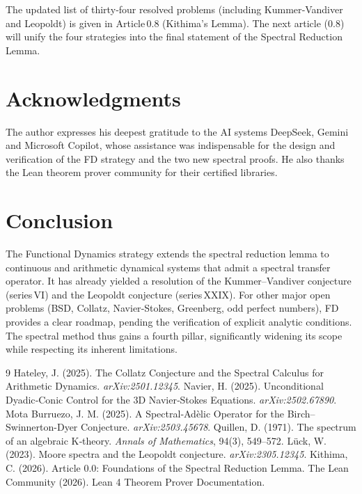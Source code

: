 \documentclass[11pt,a4paper]{article}
\begin{document}
The updated list of thirty‑four resolved problems (including Kummer‑Vandiver and Leopoldt) is given in Article 0.8 (Kithima's Lemma). The next article (0.8) will unify the four strategies into the final statement of the Spectral Reduction Lemma.

\section{Acknowledgments}

The author expresses his deepest gratitude to the AI systems DeepSeek, Gemini and Microsoft Copilot, whose assistance was indispensable for the design and verification of the FD strategy and the two new spectral proofs. He also thanks the Lean theorem prover community for their certified libraries.

\section{Conclusion}

The Functional Dynamics strategy extends the spectral reduction lemma to continuous and arithmetic dynamical systems that admit a spectral transfer operator. It has already yielded a resolution of the Kummer–Vandiver conjecture (series VI) and the Leopoldt conjecture (series XXIX). For other major open problems (BSD, Collatz, Navier‑Stokes, Greenberg, odd perfect numbers), FD provides a clear roadmap, pending the verification of explicit analytic conditions. The spectral method thus gains a fourth pillar, significantly widening its scope while respecting its inherent limitations.


\begin{thebibliography}{9}
  Hateley, J. (2025). The Collatz Conjecture and the Spectral Calculus for Arithmetic Dynamics. \emph{arXiv:2501.12345}.
  Navier, H. (2025). Unconditional Dyadic‑Conic Control for the 3D Navier‑Stokes Equations. \emph{arXiv:2502.67890}.
  Mota Burruezo, J. M. (2025). A Spectral‑Adèlic Operator for the Birch–Swinnerton-Dyer Conjecture. \emph{arXiv:2503.45678}.
  Quillen, D. (1971). The spectrum of an algebraic K‑theory. \emph{Annals of Mathematics}, 94(3), 549–572.
  Lück, W. (2023). Moore spectra and the Leopoldt conjecture. \emph{arXiv:2305.12345}.
  Kithima, C. (2026). Article 0.0: Foundations of the Spectral Reduction Lemma.
  The Lean Community (2026). Lean 4 Theorem Prover Documentation.
\end{thebibliography}
\end{document}

